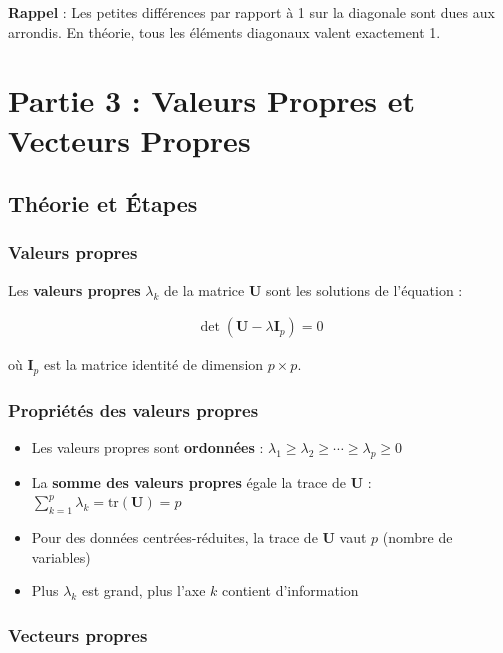 \documentclass[11pt,a4paper]{article}
\begin{document}
\begin{rappelbox}
\textbf{Rappel} : Les petites différences par rapport à 1 sur la diagonale sont dues aux arrondis. En théorie, tous les éléments diagonaux valent exactement 1.
\end{rappelbox}

\newpage

\section{Partie 3 : Valeurs Propres et Vecteurs Propres}

\subsection{Théorie et Étapes}

\subsubsection{Valeurs propres}

Les \textbf{valeurs propres} $\lambda_k$ de la matrice $\mathbf{U}$ sont les solutions de l'équation :

\begin{align*}
\det(\mathbf{U} - \lambda \mathbf{I}_p) = 0
\end{align*}

où $\mathbf{I}_p$ est la matrice identité de dimension $p \times p$.

\subsubsection{Propriétés des valeurs propres}

\begin{itemize}
    \item Les valeurs propres sont \textbf{ordonnées} : $\lambda_1 \geq \lambda_2 \geq \cdots \geq \lambda_p \geq 0$
    \item La \textbf{somme des valeurs propres} égale la trace de $\mathbf{U}$ : $\sum_{k=1}^{p} \lambda_k = \text{tr}(\mathbf{U}) = p$
    \item Pour des données centrées-réduites, la trace de $\mathbf{U}$ vaut $p$ (nombre de variables)
    \item Plus $\lambda_k$ est grand, plus l'axe $k$ contient d'information
\end{itemize}

\subsubsection{Vecteurs propres}
\end{document}
